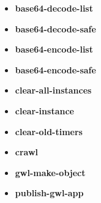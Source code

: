 \documentclass [11pt]{book}
\begin{document}
\begin{itemize}

\item {}
\label{prim:base64-decode-list}
\textbf{base64-decode-list}





\item {}
\label{prim:base64-decode-safe}
\textbf{base64-decode-safe}





\item {}
\label{prim:base64-encode-list}
\textbf{base64-encode-list}





\item {}
\label{prim:base64-encode-safe}
\textbf{base64-encode-safe}





\item {}
\label{prim:clear-all-instances}
\textbf{clear-all-instances}





\item {}
\label{prim:clear-instance}
\textbf{clear-instance}





\item {}
\label{prim:clear-old-timers}
\textbf{clear-old-timers}





\item {}
\label{prim:crawl}
\textbf{crawl}





\item {}
\label{prim:gwl-make-object}
\textbf{gwl-make-object}





\item {}
\label{prim:publish-gwl-app}
\textbf{publish-gwl-app}






\end{itemize}
\end{document}

